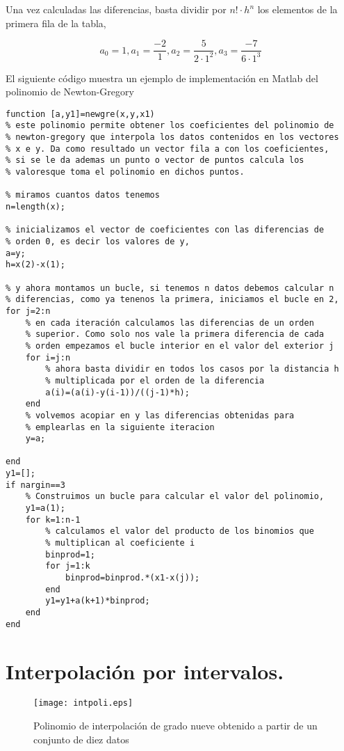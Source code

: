 Una vez calculadas las diferencias, basta dividir por $n!\cdot h^n$ los elementos de la primera fila de la tabla,

\begin{equation*}
a_0=1, a_1=\frac{-2}{1}, a_2=\frac{5}{2\cdot 1^2}, a_3=\frac{-7}{6\cdot 1^3}
\end{equation*}

El siguiente código muestra un ejemplo de implementación en Matlab del polinomio de Newton-Gregory

\begin{lstlisting}
function [a,y1]=newgre(x,y,x1)
% este polinomio permite obtener los coeficientes del polinomio de
% newton-gregory que interpola los datos contenidos en los vectores 
% x e y. Da como resultado un vector fila a con los coeficientes,  
% si se le da ademas un punto o vector de puntos calcula los  
% valoresque toma el polinomio en dichos puntos.

% miramos cuantos datos tenemos
n=length(x);

% inicializamos el vector de coeficientes con las diferencias de 
% orden 0, es decir los valores de y,
a=y;
h=x(2)-x(1);

% y ahora montamos un bucle, si tenemos n datos debemos calcular n
% diferencias, como ya tenenos la primera, iniciamos el bucle en 2,
for j=2:n
    % en cada iteración calculamos las diferencias de un orden 
    % superior. Como solo nos vale la primera diferencia de cada 
    % orden empezamos el bucle interior en el valor del exterior j
    for i=j:n
        % ahora basta dividir en todos los casos por la distancia h
        % multiplicada por el orden de la diferencia
        a(i)=(a(i)-y(i-1))/((j-1)*h);
    end
    % volvemos acopiar en y las diferencias obtenidas para 
    % emplearlas en la siguiente iteracion
    y=a;
    
end
y1=[];
if nargin==3
    % Construimos un bucle para calcular el valor del polinomio,
    y1=a(1);
    for k=1:n-1
        % calculamos el valor del producto de los binomios que 
        % multiplican al coeficiente i
        binprod=1;
        for j=1:k
            binprod=binprod.*(x1-x(j));
        end
        y1=y1+a(k+1)*binprod;
    end
end
\end{lstlisting}


\section{Interpolación por intervalos.}
\begin{figure}[h]
\centering
\texttt{[image: intpoli.eps]}
\caption{Polinomio de interpolación de grado nueve obtenido a partir de un conjunto de diez datos} 
\label{fig:intepol}
\end{figure}

